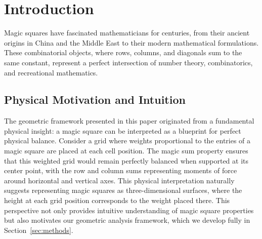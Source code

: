 \section{Introduction}

Magic squares have fascinated mathematicians for centuries, from their ancient origins in China and the Middle East to their modern mathematical formulations. These combinatorial objects, where rows, columns, and diagonals sum to the same constant, represent a perfect intersection of number theory, combinatorics, and recreational mathematics.

\subsection{Physical Motivation and Intuition}

The geometric framework presented in this paper originated from a fundamental physical insight: a magic square can be interpreted as a blueprint for perfect physical balance. Consider a grid where weights proportional to the entries of a magic square are placed at each cell position. The magic sum property ensures that this weighted grid would remain perfectly balanced when supported at its center point, with the row and column sums representing moments of force around horizontal and vertical axes. This physical interpretation naturally suggests representing magic squares as three-dimensional surfaces, where the height at each grid position corresponds to the weight placed there. This perspective not only provides intuitive understanding of magic square properties but also motivates our geometric analysis framework, which we develop fully in Section~\ref{sec:methods}.

